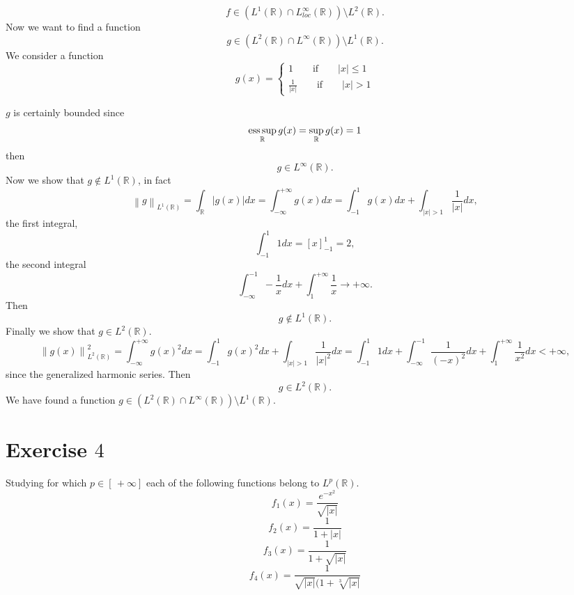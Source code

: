 \documentclass[a4paper, twoside, openany]{book}
\newcommand{\R}{\mathbb{R}}
\newcommand{\esssup}{\operatornamewithlimits{ess\,sup}}
\newcommand{\norm}[1]{\left\lVert#1\right\rVert}
\begin{document}
$$f \in (L^1(\mathbb{R}) \cap L_{loc}^{\infty}(\mathbb{R})) \setminus L^2(\mathbb{R}).$$ 
\clearpage
Now we want to find a function 
$$g \in (L^2(\mathbb{R}) \cap L^{\infty}(\mathbb{R})) \setminus L^1(\mathbb{R}).$$
We consider a function
$$g(x) = \begin{cases}
			1 \qquad \textrm{if} \qquad |x| \leq 1 \\
			\frac{1}{|x|} \qquad \textrm{if} \qquad |x| > 1
		 \end{cases}$$
\begin{figure}[!ht]
\begin{center}
\end{center}
\end{figure}
$g$ is certainly bounded since
$$\esssup_{\R} g(x) = \sup_{\R} g(x) = 1$$
then
$$g \in L^{\infty}(\R).$$
Now we show that $g \notin L^1(\R)$, in fact
$$\norm{g}_{L^1(\R)} = \int_{\R} |g(x)| dx = \int_{-\infty}^{+\infty} g(x) dx = \int_{-1}^1 g(x) dx  + \int_{|x| > 1} \frac{1}{|x|} dx,$$
the first integral,
$$\int_{-1}^1 1 dx = [x]_{-1}^1 = 2,$$
the second integral
$$\int_{-\infty}^{-1} -\frac{1}{x} dx + \int_1^{+\infty} \frac{1}{x} \rightarrow + \infty.$$
Then
$$g \notin L^1(\R).$$
Finally we show that $g \in L^2(\R)$.
$$\norm{g(x)}_{L^2(\R)}^2 = \int_{-\infty}^{+\infty} g(x)^2 dx = \int_{-1}^1 g(x)^2 dx + \int_{|x| > 1} \frac{1}{|x|^2} dx = \int_{-1}^1 1 dx + \int_{-\infty}^{-1} \frac{1}{(-x)^2} dx  + \int_1^{+\infty} \frac{1}{x^2} dx < +\infty,$$
since the generalized harmonic series. Then
$$g \in L^2(\R).$$
We have found a function $g \in (L^2(\R) \cap L^{\infty}(\R)) \setminus L^1(\R)$.
\clearpage
\section*{Exercise $4$}
Studying for which $p \in [\, +\infty]$ each of the following functions belong to $L^p(\R)$.
$$f_1(x) = \frac{e^{-x^2}}{\sqrt{|x|}}$$
$$f_2(x) = \frac{1}{1 + |x|}$$
$$f_3(x) = \frac{1}{1 + \sqrt{|x|}}$$
$$f_4(x) = \frac{1}{\sqrt{|x|}(1 + \sqrt[3]{|x|}}$$
\end{document}
